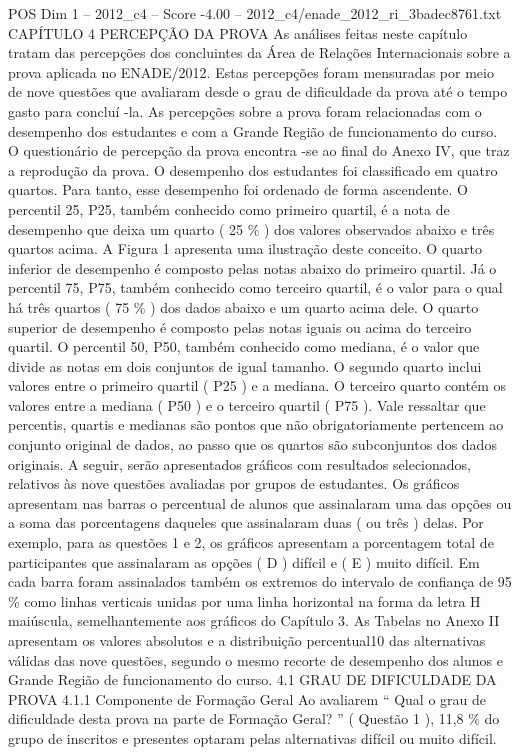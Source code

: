 \begin{textsample}{POS Dim 1 – 2012\_c4 – Score -4.00 – 2012\_c4/enade\_2012\_ri\_3badec8761.txt}  \label{ex:f1_pos_363}
CAPÍTULO 4 PERCEPÇÃO DA PROVA As análises feitas neste capítulo tratam das percepções dos concluintes da Área de Relações Internacionais sobre a prova aplicada no ENADE/2012.
Estas percepções foram mensuradas por meio de nove questões que avaliaram desde o grau de dificuldade da prova até o tempo gasto para concluí -la.
As percepções sobre a prova foram relacionadas com o desempenho dos estudantes e com a Grande Região de funcionamento do curso.
O questionário de percepção da prova encontra -se ao final do Anexo IV, que traz a reprodução da prova.
O desempenho dos estudantes foi classificado em quatro quartos.
Para tanto, esse desempenho foi ordenado de forma ascendente.
O percentil 25, P25, também conhecido como primeiro quartil, é a nota de desempenho que deixa um quarto ( 25 \% ) dos valores observados abaixo e três quartos acima.
A Figura 1 apresenta uma ilustração deste conceito.
O quarto inferior de desempenho é composto pelas notas abaixo do primeiro quartil.
Já o percentil 75, P75, também conhecido como terceiro quartil, é o valor para o qual há três quartos ( 75 \% ) dos dados abaixo e um quarto acima dele.
O quarto superior de desempenho é composto pelas notas iguais ou acima do terceiro quartil.
O percentil 50, P50, também conhecido como mediana, é o valor que divide as notas em dois conjuntos de igual tamanho.
O segundo quarto inclui valores entre o primeiro quartil ( P25 ) e a mediana.
O terceiro quarto contém os valores entre a mediana ( P50 ) e o terceiro quartil ( P75 ).
Vale ressaltar que percentis, quartis e medianas são pontos que não obrigatoriamente pertencem ao conjunto original de dados, ao passo que os quartos são subconjuntos dos dados originais.
A seguir, serão apresentados gráficos com resultados selecionados, relativos às nove questões avaliadas por grupos de estudantes.
Os gráficos apresentam nas barras o percentual de alunos que assinalaram uma das opções ou a soma das porcentagens daqueles que assinalaram duas ( ou três ) delas.
Por exemplo, para as questões 1 e 2, os gráficos apresentam a porcentagem total de participantes que assinalaram as opções ( D ) difícil e ( E ) muito difícil.
Em cada barra foram assinalados também os extremos do intervalo de confiança de 95 \% como linhas verticais unidas por uma linha horizontal na forma da letra H maiúscula, semelhantemente aos gráficos do Capítulo 3.
As Tabelas no Anexo II apresentam os valores absolutos e a distribuição percentual10 das alternativas válidas das nove questões, segundo o mesmo recorte de desempenho dos alunos e Grande Região de funcionamento do curso. 4.1 GRAU DE DIFICULDADE DA PROVA 4.1.1 Componente de Formação Geral Ao avaliarem “ Qual o grau de dificuldade desta prova na parte de Formação Geral? ” ( Questão 1 ), 11,8 \% do grupo de inscritos e presentes optaram pelas alternativas difícil ou muito difícil.

\end{textsample}
